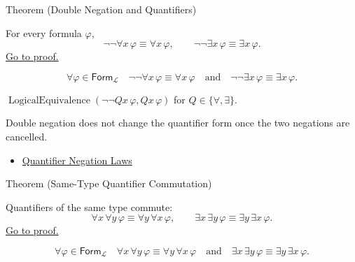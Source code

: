 \begin{theorembox}{Theorem (Double Negation and Quantifiers)}
\begin{theorem}
\label{thm:quantifier-double-negation}
For every formula \(\varphi\),
\[
\neg\neg\forall x\,\varphi \equiv \forall x\,\varphi,
\qquad
\neg\neg\exists x\,\varphi \equiv \exists x\,\varphi.
\]
\hyperref[prf:quantifier-double-negation]{Go to proof.}
\end{theorem}
\end{theorembox}

\begin{remark*}
\[
\forall \varphi\in\mathsf{Form}_{\mathcal L}\quad
\neg\neg\forall x\,\varphi \equiv \forall x\,\varphi
\quad\text{and}\quad
\neg\neg\exists x\,\varphi \equiv \exists x\,\varphi.
\]
\end{remark*}

\begin{remark*}
\(\operatorname{LogicalEquivalence}(\neg\neg Qx\,\varphi,Qx\,\varphi)\) for
\(Q\in\{\forall,\exists\}\).
\end{remark*}

\begin{remark*}[Interpretation]
Double negation does not change the quantifier form once the two negations are
cancelled.
\end{remark*}

\begin{dependencies}
\begin{itemize}
  \item \hyperref[thm:qneg]{Quantifier Negation Laws}
\end{itemize}
\end{dependencies}

\begin{theorembox}{Theorem (Same-Type Quantifier Commutation)}
\begin{theorem}
\label{thm:qcomm}
Quantifiers of the same type commute:
\[
\forall x\,\forall y\,\varphi \equiv \forall y\,\forall x\,\varphi,
\qquad
\exists x\,\exists y\,\varphi \equiv \exists y\,\exists x\,\varphi.
\]
\hyperref[prf:qcomm]{Go to proof.}
\end{theorem}
\end{theorembox}

\begin{remark*}
\[
\forall \varphi\in\mathsf{Form}_{\mathcal L}\quad
\forall x\,\forall y\,\varphi \equiv \forall y\,\forall x\,\varphi
\quad\text{and}\quad
\exists x\,\exists y\,\varphi \equiv \exists y\,\exists x\,\varphi.
\]
\end{remark*}

